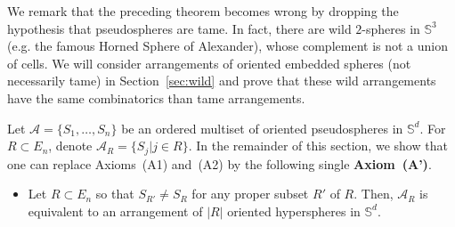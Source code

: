 \documentclass[a4paper]{amsart}
\newcommand{\begriff}[1]{\textbf{#1}}
\newcommand{\p}{\mathbb S}
\theoremstyle{definition}
\theoremstyle{remark}
\begin{document}
We remark that the preceding theorem becomes wrong by dropping the
hypothesis that pseudospheres are tame. In fact, there are wild
$2$-spheres in $\p^3$ (e.g. the famous Horned Sphere of Alexander),
whose complement is not a union of cells. We will consider arrangements
of oriented embedded spheres (not necessarily tame) in
Section~\ref{sec:wild} and prove that these wild arrangements have the
same combinatorics than tame arrangements.

Let $\mathcal A = \{S_1,\dots, S_n\}$ be an ordered multiset of oriented
pseudospheres in $\p^d$. For $R\subset E_n$, denote $\mathcal A_R =
\{S_j | j\in R\}$.
%
In the remainder of this section, we show that one can replace
Axioms~(A1) and~(A2) by the following single \begriff{Axiom~(A')}. 
\begin{itemize}
\item[(A')] Let $R\subset E_n$ so that $S_{R'}\not= S_R$ for any proper
  subset $R'$ of $R$.
  Then, $\mathcal A_{R}$ is equivalent to an arrangement of
  $|R| $ oriented hyperspheres in $\p^d$.
  \end{itemize}
\end{document}
